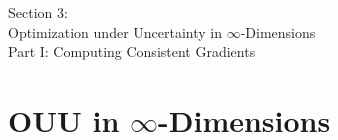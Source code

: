\documentclass[aspectratio=169,xcolor=dvipsnames,10pt]{beamer}
\newcommand{\CVaR}{\textup{CVaR}}
\newcommand{\bbp}{\mathbb{P}}
\newcommand{\cF}{\mathcal{F}}
\begin{document}

\begin{frame}\frametitle{}
\begin{center}\Large
Section 3: \\
Optimization under Uncertainty in $\infty$-Dimensions \\
Part I: Computing Consistent Gradients
\end{center}
\end{frame}


\section{OUU in $\infty$-Dimensions}
\end{document}
